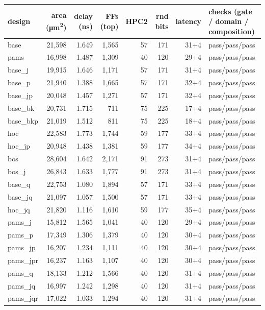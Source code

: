 \begin{tabular}{@{}lrrrrrrl@{}}
\toprule
design & area (\si{\micro\meter\squared}) & delay (ns) & FFs (top) & HPC2 & rnd bits & latency & checks (gate / domain / composition) \\
\midrule
base & 21{,}598 & 1.649 & 1{,}565 & 57 & 171 & 31+4 & pass/pass/pass \\
pams & 16{,}998 & 1.487 & 1{,}309 & 40 & 120 & 29+4 & pass/pass/pass \\
base\_j & 19{,}915 & 1.646 & 1{,}171 & 57 & 171 & 31+4 & pass/pass/pass \\
base\_p & 21{,}940 & 1.388 & 1{,}665 & 57 & 171 & 32+4 & pass/pass/pass \\
base\_jp & 20{,}048 & 1.457 & 1{,}271 & 57 & 171 & 32+4 & pass/pass/pass \\
base\_bk & 20{,}731 & 1.715 & 711 & 75 & 225 & 17+4 & pass/pass/pass \\
base\_bkp & 21{,}019 & 1.512 & 811 & 75 & 225 & 18+4 & pass/pass/pass \\
hoc & 22{,}583 & 1.773 & 1{,}744 & 59 & 177 & 33+4 & pass/pass/pass \\
hoc\_jp & 20{,}948 & 1.438 & 1{,}381 & 59 & 177 & 34+4 & pass/pass/pass \\
bos & 28{,}604 & 1.642 & 2{,}171 & 91 & 273 & 31+4 & pass/pass/pass \\
bos\_j & 26{,}843 & 1.633 & 1{,}777 & 91 & 273 & 31+4 & pass/pass/pass \\
base\_q & 22{,}753 & 1.080 & 1{,}894 & 57 & 171 & 33+4 & pass/pass/pass \\
base\_jq & 21{,}097 & 1.057 & 1{,}500 & 57 & 171 & 33+4 & pass/pass/pass \\
hoc\_jq & 21{,}820 & 1.116 & 1{,}610 & 59 & 177 & 35+4 & pass/pass/pass \\
pams\_j & 15{,}812 & 1.565 & 1{,}041 & 40 & 120 & 29+4 & pass/pass/pass \\
pams\_p & 17{,}349 & 1.306 & 1{,}379 & 40 & 120 & 30+4 & pass/pass/pass \\
pams\_jp & 16{,}207 & 1.234 & 1{,}111 & 40 & 120 & 30+4 & pass/pass/pass \\
pams\_jpr & 16{,}237 & 1.163 & 1{,}107 & 40 & 120 & 30+4 & pass/pass/pass \\
pams\_q & 18{,}133 & 1.212 & 1{,}566 & 40 & 120 & 31+4 & pass/pass/pass \\
pams\_jq & 16{,}997 & 1.242 & 1{,}298 & 40 & 120 & 31+4 & pass/pass/pass \\
pams\_jqr & 17{,}022 & 1.033 & 1{,}294 & 40 & 120 & 31+4 & pass/pass/pass \\
\bottomrule
\end{tabular}
